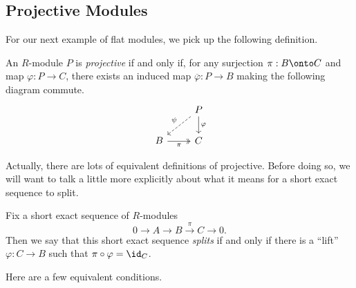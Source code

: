 \subsection{Projective Modules}
For our next example of flat modules, we pick up the following definition.
\begin{definition}[Projective] \label{def:projective}
	An $R$-module $P$ is \textit{projective} if and only if, for any surjection $\pi:B\onto C$ and map $\varphi:P\to C$, there exists an induced map $\overline\varphi:P\to B$ making the following diagram commute.
	\[\begin{tikzcd}
		& P \\
		B & {C}
		\arrow["\pi"', two heads, from=2-1, to=2-2]
		\arrow["\varphi", from=1-2, to=2-2]
		\arrow["\psi"', dashed, from=1-2, to=2-1]
	\end{tikzcd}\]
\end{definition}
Actually, there are lots of equivalent definitions of projective. Before doing so, we will want to talk a little more explicitly about what it means for a short exact sequence to split.
\begin{definition}[Splits] \label{def:splits}
	Fix a short exact sequence of $R$-modules
	\[0\to A\to B\stackrel\pi\to C\to0.\]
	Then we say that this short exact sequence \textit{splits} if and only if there is a ``lift'' $\varphi:C\to B$ such that $\pi\circ\varphi=\id_C$.
\end{definition}
Here are a few equivalent conditions.
